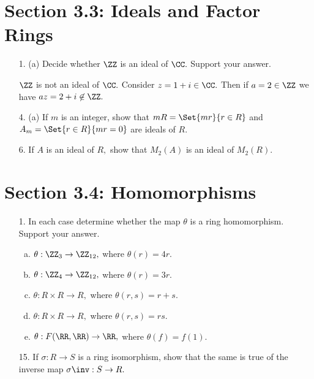 \documentclass{article}
\begin{document}
\section*{Section 3.3: Ideals and Factor Rings}

\begin{itemize}
	\item[1.] (a) Decide whether $\ZZ$ is an ideal of $\CC.$ Support your answer.
		\begin{soln}
			$\ZZ$ is not an ideal of $\CC.$ Consider $z=1+i\in\CC.$ Then if $a=2\in \ZZ$ we have $az=2+i\not\in\ZZ.$
		\end{soln}

	\item[4.] (a) If $m$ is an integer, show that $mR=\Set{mr}{r\in R}$ and $A_m=\Set{r\in R}{mr=0}$ are ideals of $R.$

	\item[6.] If $A$ is an ideal of $R,$ show that $M_2(A)$ is an ideal of $M_2(R).$
		
\end{itemize}

\section*{Section 3.4: Homomorphisms}

\begin{itemize}
	\item[1.] In each case determine whether the map $\theta$ is a ring homomorphism. Support your answer.
		\begin{enumerate}[(a)]
			\item $\theta:\ZZ_3\to\ZZ_{12},$ where $\theta(r)=4r.$

			\item $\theta:\ZZ_4\to\ZZ_{12},$ where $\theta(r)=3r.$

			\item $\theta:R\times R\to R,$ where $\theta(r, s)=r+s.$

			\item $\theta:R\times R\to R,$ where $\theta(r, s)=rs.$

			\item $\theta:F(\RR, \RR)\to \RR,$ where $\theta(f)=f(1).$
				
		\end{enumerate}

	\item[15.] If $\sigma:R\to S$ is a ring isomorphism, show that the same is true of the inverse map $\sigma\inv:S\to R.$
		
\end{itemize}
\end{document}
